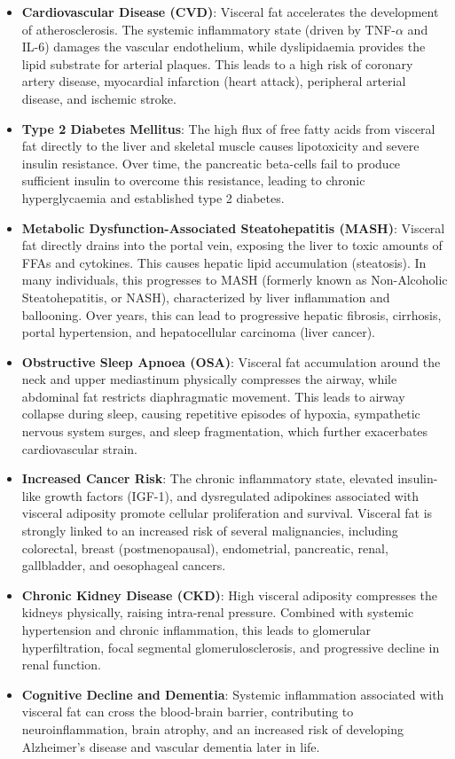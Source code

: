 \begin{itemize}
    \item \textbf{Cardiovascular Disease (CVD)}: Visceral fat accelerates the development of atherosclerosis. The systemic inflammatory state (driven by TNF-$\alpha$ and IL-6) damages the vascular endothelium, while dyslipidaemia provides the lipid substrate for arterial plaques. This leads to a high risk of coronary artery disease, myocardial infarction (heart attack), peripheral arterial disease, and ischemic stroke.
    \item \textbf{Type 2 Diabetes Mellitus}: The high flux of free fatty acids from visceral fat directly to the liver and skeletal muscle causes lipotoxicity and severe insulin resistance. Over time, the pancreatic beta-cells fail to produce sufficient insulin to overcome this resistance, leading to chronic hyperglycaemia and established type 2 diabetes.
    \item \textbf{Metabolic Dysfunction-Associated Steatohepatitis (MASH)}: Visceral fat directly drains into the portal vein, exposing the liver to toxic amounts of FFAs and cytokines. This causes hepatic lipid accumulation (steatosis). In many individuals, this progresses to MASH (formerly known as Non-Alcoholic Steatohepatitis, or NASH), characterized by liver inflammation and ballooning. Over years, this can lead to progressive hepatic fibrosis, cirrhosis, portal hypertension, and hepatocellular carcinoma (liver cancer).
    \item \textbf{Obstructive Sleep Apnoea (OSA)}: Visceral fat accumulation around the neck and upper mediastinum physically compresses the airway, while abdominal fat restricts diaphragmatic movement. This leads to airway collapse during sleep, causing repetitive episodes of hypoxia, sympathetic nervous system surges, and sleep fragmentation, which further exacerbates cardiovascular strain.
    \item \textbf{Increased Cancer Risk}: The chronic inflammatory state, elevated insulin-like growth factors (IGF-1), and dysregulated adipokines associated with visceral adiposity promote cellular proliferation and survival. Visceral fat is strongly linked to an increased risk of several malignancies, including colorectal, breast (postmenopausal), endometrial, pancreatic, renal, gallbladder, and oesophageal cancers.
    \item \textbf{Chronic Kidney Disease (CKD)}: High visceral adiposity compresses the kidneys physically, raising intra-renal pressure. Combined with systemic hypertension and chronic inflammation, this leads to glomerular hyperfiltration, focal segmental glomerulosclerosis, and progressive decline in renal function.
    \item \textbf{Cognitive Decline and Dementia}: Systemic inflammation associated with visceral fat can cross the blood-brain barrier, contributing to neuroinflammation, brain atrophy, and an increased risk of developing Alzheimer's disease and vascular dementia later in life.
\end{itemize}

